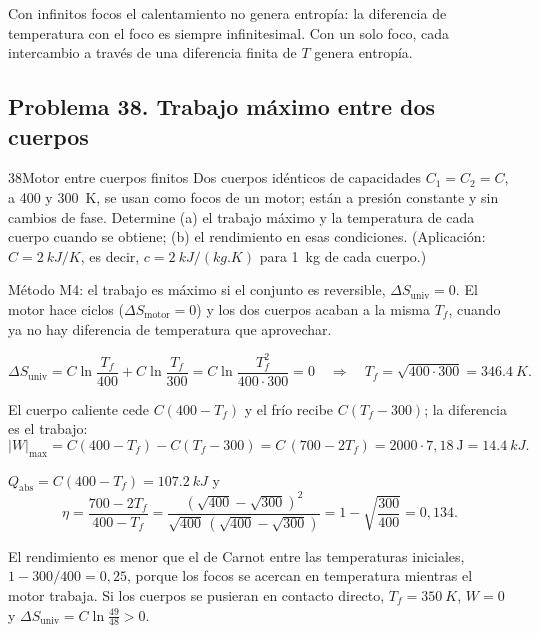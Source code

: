 \begin{observacion}[Lectura]
Con infinitos focos el calentamiento no genera entropía: la diferencia de temperatura con el foco es siempre
infinitesimal. Con un solo foco, cada intercambio a través de una diferencia finita de $T$ genera entropía.
\end{observacion}

\subsection{Problema 38. Trabajo máximo entre dos cuerpos}
\begin{problema}{38}{Motor entre cuerpos finitos}
Dos cuerpos idénticos de capacidades $C_1=C_2=C$, a 400 y \SI{300}{K}, se usan como focos de un motor; están a presión
constante y sin cambios de fase. Determine (a) el trabajo máximo y la temperatura de cada cuerpo cuando se obtiene;
(b) el rendimiento en esas condiciones. (Aplicación: $C=\SI{2}{kJ/K}$, es decir, $c=\SI{2}{kJ/(kg.K)}$ para \SI{1}{kg}
de cada cuerpo.)
\end{problema}

\begin{resolucion}
\idea Método M4: el trabajo es máximo si el conjunto es reversible, $\Delta S_{\mathrm{univ}}=0$. El motor hace
ciclos ($\Delta S_{\mathrm{motor}}=0$) y los dos cuerpos acaban a la misma $T_f$, cuando ya no hay diferencia de
temperatura que aprovechar.

\[
  \Delta S_{\mathrm{univ}}=C\ln\frac{T_f}{400}+C\ln\frac{T_f}{300}=C\ln\frac{T_f^2}{400\cdot300}=0
  \quad\Longrightarrow\quad T_f=\sqrt{400\cdot300}=\boxed{\SI{346,4}{K}} .
\]

 El cuerpo caliente cede $C(400-T_f)$ y el frío recibe $C(T_f-300)$; la diferencia es el
trabajo:
\[
  |W|_{\max}=C(400-T_f)-C(T_f-300)=C\,(700-2T_f)=2000\cdot7{,}18\ \mathrm J=\boxed{\SI{14,4}{kJ}} .
\]

 $Q_{\mathrm{abs}}=C(400-T_f)=\SI{107,2}{kJ}$ y
\[
  \eta=\frac{700-2T_f}{400-T_f}=\frac{(\sqrt{400}-\sqrt{300})^2}{\sqrt{400}\,(\sqrt{400}-\sqrt{300})}
      =1-\sqrt{\frac{300}{400}}=\boxed{0{,}134}.
\]
\end{resolucion}

\begin{observacion}[Comparación]
El rendimiento es menor que el de Carnot entre las temperaturas iniciales, $1-300/400=0{,}25$, porque los focos se
acercan en temperatura mientras el motor trabaja. Si los cuerpos se pusieran en contacto directo, $T_f=\SI{350}{K}$,
$W=0$ y $\Delta S_{\mathrm{univ}}=C\ln\frac{49}{48}>0$.
\end{observacion}

